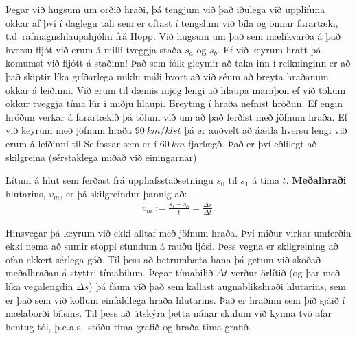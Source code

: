 \ifdefined \wholebook \else\documentclass[oneside]{book}\usepackage{EdlBook}\graphicspath{{figures/}}
\begin{document}
Þegar við hugsum um orðið hraði, þá tengjum við það iðulega við upplifuna okkar af því í daglegu tali sem er oftast í tengslum við bíla og önnur farartæki, t.d~rafmagnshlaupahjólin frá Hopp. Við hugsum um það sem mælikvarða á það hversu fljót við erum á milli tveggja staða $s_a$ og $s_b$. Ef við keyrum hratt þá komumst við fljótt á staðinn! Það sem fólk gleymir að taka inn í reikninginn er að það skiptir líka gríðarlega miklu máli hvort að við séum að breyta hraðanum okkar á leiðinni. Við erum til dæmis mjög lengi að hlaupa maraþon ef við tökum okkur tveggja tíma lúr í miðju hlaupi. Breyting í hraða nefnist hröðun. Ef engin hröðun verkar á farartækið þá tölum við um að það ferðist með jöfnum hraða. Ef við keyrum með jöfnum hraða $\SI{90}{km/klst}$ þá er auðvelt að áætla hversu lengi við erum á leiðinni til Selfossar sem er í $\SI{60}{km}$ fjarlægð. Það er því eðlilegt að skilgreina (sérstaklega miðað við einingarnar)
\begin{tcolorbox}
\begin{definition}
Lítum á hlut sem ferðast frá upphafsstaðsetningu $s_0$ til $s_1$ á tíma $t$. \textbf{Meðalhraði} hlutarins, $v_m$, er þá skilgreindur þannig að:
\begin{align*}
    v_m := \frac{s_1 - s_0}{t} = \frac{\Delta s}{\Delta t}.
\end{align*}
\end{definition}
\end{tcolorbox}

Hinsvegar þá keyrum við ekki alltaf með jöfnum hraða. Því miður virkar umferðin ekki nema að sumir stoppi stundum á rauðu ljósi. Þess vegna er skilgreining að ofan ekkert sérlega góð. Til þess að betrumbæta hana þá getum við skoðað meðalhraðan á styttri tímabilum. Þegar tímabilið $\Delta t$ verður örlítið (og þar með líka vegalengdin $\Delta s$) þá fáum við það sem kallast augnablikshraði hlutarins, sem er það sem við köllum einfaldlega hraða hlutarins. Það er hraðinn sem þið sjáið í mælaborði bílsins. Til þess að útskýra þetta nánar skulum við kynna tvö afar hentug tól, þ.e.a.s.~stöðu-tíma grafið og hraða-tíma grafið.
\end{document}
